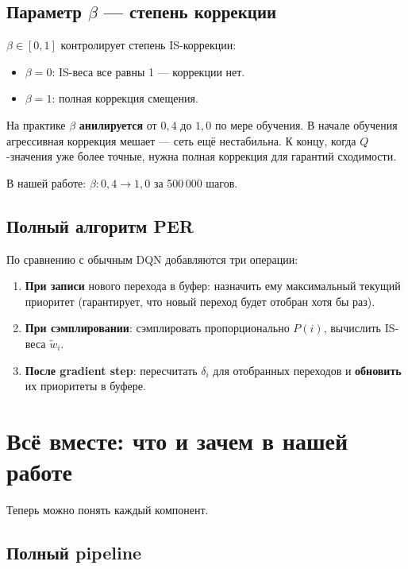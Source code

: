 \documentclass[a4paper, 11pt]{article}
\begin{document}
\subsection{Параметр $\beta$ — степень коррекции}

$\beta \in [0, 1]$ контролирует степень IS-коррекции:
\begin{itemize}[itemsep=2pt]
  \item $\beta = 0$: IS-веса все равны 1 — коррекции нет.
  \item $\beta = 1$: полная коррекция смещения.
\end{itemize}

На практике $\beta$ \textbf{анилируется} от $0{,}4$ до $1{,}0$ по мере
обучения. В начале обучения агрессивная коррекция мешает — сеть ещё
нестабильна. К концу, когда $Q$-значения уже более точные, нужна полная
коррекция для гарантий сходимости.

В нашей работе: $\beta: 0{,}4 \to 1{,}0$ за 500\,000 шагов.

\subsection{Полный алгоритм PER}

По сравнению с обычным DQN добавляются три операции:

\begin{enumerate}[itemsep=3pt]
  \item \textbf{При записи} нового перехода в буфер: назначить ему
        максимальный текущий приоритет (гарантирует, что новый переход
        будет отобран хотя бы раз).
  \item \textbf{При сэмплировании}: сэмплировать пропорционально
        $P(i)$, вычислить IS-веса $\tilde{w}_i$.
  \item \textbf{После gradient step}: пересчитать $\delta_i$ для
        отобранных переходов и \textbf{обновить} их приоритеты в буфере.
\end{enumerate}

\section{Всё вместе: что и зачем в нашей работе}

Теперь можно понять каждый компонент.

\subsection{Полный pipeline}
\end{document}
